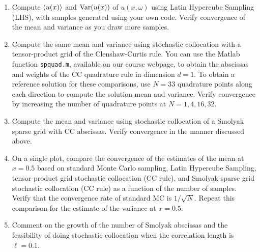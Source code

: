 \documentclass[11pt]{article}
\begin{document}
\begin{enumerate}

\item Compute $\left\langle u(x) \right\rangle$ and $\operatorname{Var}(u(x))$ of $u(x,\omega)$ using Latin Hypercube Sampling (LHS), with samples generated using your own code. Verify convergence of the mean and variance as you draw more samples.

\item Compute the same mean and variance using stochastic collocation with a tensor-product grid of the Clenshaw-Curtis rule. You can use the Matlab function \lstinline|spquad.m|, available on our course webpage, to obtain the abscissas and weights of the CC quadrature rule in dimension $d=1$. To obtain a reference solution for these comparisons, use $N=33$ quadrature points along each direction to compute the solution mean and variance. Verify convergence by increasing the number of quadrature points at $N = 1, 4, 16, 32$.

\item Compute the mean and variance using stochastic collocation of a Smolyak sparse grid with CC abscissas. Verify convergence in the manner discussed above.

\item On a single plot, compare the convergence of the estimates of the mean at $x=0.5$ based on standard Monte Carlo sampling, Latin Hypercube Sampling, tensor-product grid stochastic collocation (CC rule), and Smolyak sparse grid stochastic collocation (CC rule) as a function of the number of samples. Verify that the convergence rate of standard MC is $1/\sqrt{N}$. Repeat this comparison for the estimate of the variance at $x=0.5$.

\item Comment on the growth of the number of Smolyak abscissas and the feasibility of doing stochastic collocation when the correlation length is $\ell = 0.1$.

\end{enumerate}



\end{document}
